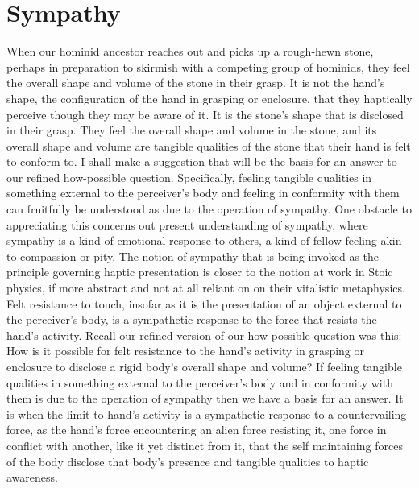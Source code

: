 
\section{Sympathy} %
\label{sec:sympathy_and_haptic_perception}

When our hominid ancestor reaches out and picks up a rough-hewn stone, perhaps in preparation to skirmish with a competing group of hominids, they feel the overall shape and volume of the stone in their grasp. It is not the hand's shape, the configuration of the hand in grasping or enclosure, that they haptically perceive though they may be aware of it. It is the stone's shape that is disclosed in their grasp. They feel the overall shape and volume in the stone, and its overall shape and volume are tangible qualities of the stone that their hand is felt to conform to. I shall make a suggestion that will be the basis for an answer to our refined how-possible question. Specifically, feeling tangible qualities in something external to the perceiver's body and feeling in conformity with them can fruitfully be understood as due to the operation of sympathy. One obstacle to appreciating this concerns out present understanding of sympathy, where sympathy is a kind of emotional response to others, a kind of fellow-feeling akin to compassion or pity. The notion of sympathy that is being invoked as the principle governing haptic presentation is closer to the notion at work in Stoic physics, if more abstract and not at all reliant on on their vitalistic metaphysics. Felt resistance to touch, insofar as it is the presentation of an object external to the perceiver's body, is a sympathetic response to the force that resists the hand's activity. Recall our refined version of our how-possible question was this: How is it possible for felt resistance to the hand's activity in grasping or enclosure to disclose a rigid body's overall shape and volume? If feeling tangible qualities in something external to the perceiver's body and in conformity with them is due to the operation of sympathy then we have a basis for an answer. It is when the limit to hand's activity is a sympathetic response to a countervailing force, as the hand's force encountering an alien force resisting it, one force in conflict with another, like it yet distinct from it, that the self maintaining forces of the body disclose that body's presence and tangible qualities to haptic awareness.

